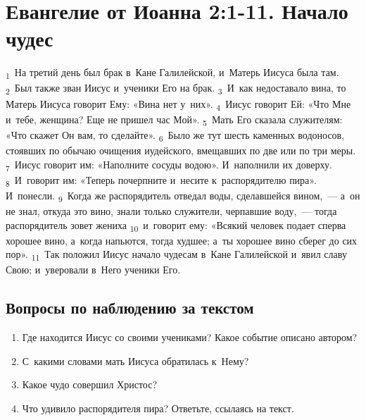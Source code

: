 \documentclass[a4paper,12pt]{article}
\begin{document}

\section{Евангелие от Иоанна 2:1-11. Начало чудес}

\textsubscript{1}~На третий день был брак в~Кане Галилейской, и~Матерь Иисуса была там. \textsubscript{2}~Был также зван Иисус и~ученики Его на брак. \textsubscript{3}~И~как недоставало вина, то Матерь Иисуса говорит Ему: «Вина нет у~них». \textsubscript{4}~Иисус говорит Ей: «Что Мне и~тебе, женщина? Еще не пришел час Мой». \textsubscript{5}~Мать Его сказала служителям: «Что скажет Он вам, то сделайте». \textsubscript{6}~Было же тут шесть каменных водоносов, стоявших по обычаю очищения иудейского, вмещавших по две или по три меры. \textsubscript{7}~Иисус говорит им: «Наполните сосуды водою». И~наполнили их доверху. \textsubscript{8}~И~говорит им: «Теперь почерпните и~несите к~распорядителю пира». И~понесли. \textsubscript{9}~Когда же распорядитель отведал воды, сделавшейся вином,~--- а~он не знал, откуда это вино, знали только служители, черпавшие воду,~--- тогда распорядитель зовет жениха \textsubscript{10}~и~говорит ему: «Всякий человек подает сперва хорошее вино, а~когда напьются, тогда худшее; а~ты хорошее вино сберег до сих пор». \textsubscript{11}~Так положил Иисус начало чудесам в~Кане Галилейской и~явил славу Свою; и~уверовали в~Него ученики Его.

\subsection*{Вопросы по наблюдению за текстом}
\begin{enumerate}
    \item Где находится Иисус со своими учениками? Какое событие описано автором? 
    
    \myline
    
    \myline
    \item С~какими словами мать Иисуса обратилась к~Нему? 
    
    \myline
    
    \myline
    \item Какое чудо совершил Христос? 
    
    \myline
    
    \myline
    \item Что удивило распорядителя пира? Ответьте, ссылаясь на текст.

    \myline
    
    \myline
\end{enumerate}
\end{document}
